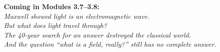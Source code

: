 \documentclass[12pt, a4paper, twoside]{book}
\theoremstyle{disc}
\begin{document}
\vspace{0.5cm}
\begin{center}
{\large\textcolor{deep}{\textbf{Coming in Modules 3.7--3.8:}}}\\[6pt]
{\itshape\textcolor{midblue}{%
Maxwell showed light is an electromagnetic wave.\\[3pt]
But what does light travel \emph{through}?\\[3pt]
The 40-year search for an answer destroyed the classical world.\\[3pt]
And the question ``what \emph{is} a field, really?'' still has no complete answer.
}}
\end{center}
\end{document}
